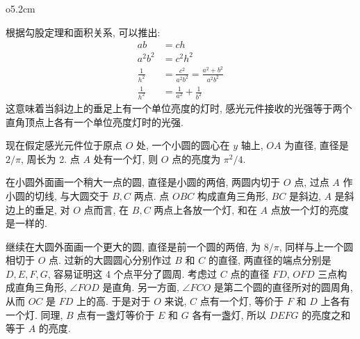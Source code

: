 \begin{wrapfigure}{o}{5.2cm}
\centering
{}
\end{wrapfigure}
\indent 根据勾股定理和面积关系, 可以推出:
\begin{align*}
ab &= ch \\
a^2b^2 &= c^2h^2\\
\frac{1}{h^2} &= \frac{c^2}{a^2b^2}=\frac{a^2+b^2}{a^2b^2}\\
\frac{1}{h^2} &= \frac{1}{a^2} + \frac{1}{b^2}
\end{align*}
这意味着当斜边上的垂足上有一个单位亮度的灯时, 感光元件接收的光强等于两个直角顶点上各有一个单位亮度灯时的光强.

现在假定感光元件位于原点 $ O $ 处, 一个小圆的圆心在 $ y $ 轴上, $ OA $ 为直径, 直径是 $ 2/\pi $, 周长为 2. 点 $ A $ 处有一个灯, 则 $ O $ 点的亮度为 $ \pi^2/4 $. 

在小圆外面画一个稍大一点的圆, 直径是小圆的两倍, 两圆内切于 $ O $ 点, 过点 $ A $ 作小圆的切线, 与大圆交于 $ B, C $ 两点. 点 $ OBC $ 构成直角三角形, $ BC $ 是斜边, $ A $ 是斜边上的垂足, 对 $ O $ 点而言, 在 $ B, C $ 两点上各放一个灯, 和在 $ A $ 点放一个灯的亮度是一样的. 

继续在大圆外面画一个更大的圆, 直径是前一个圆的两倍, 为 $ 8/\pi $, 同样与上一个圆相切于 $ O $ 点. 过新的大圆圆心分别作过 $ B $ 和 $ C $ 的直径, 两直径的端点分别是 $ D, E, F, G $, 容易证明这 4 个点平分了圆周. 考虑过 $ C $ 点的直径 $ FD $, $ OFD $ 三点构成直角三角形, $ \angle FOD $ 是直角. 另一方面, $ \angle FCO $ 是第二个圆的直径所对的圆周角, 从而 $ OC $ 是 $ FD $ 上的高. 于是对于 $ O $ 来说, $ C $ 点有一个灯, 等价于 $ F $ 和 $ D $ 上各有一个灯. 同理, $ B $ 点有一盏灯等价于 $ E $ 和 $ G $ 各有一盏灯, 所以 $ DEFG $ 的亮度之和等于 $ A $ 的亮度.

